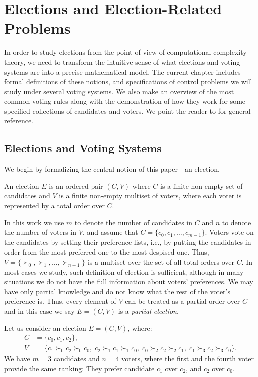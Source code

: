 \chapter{Elections and Election-Related Problems} \label{ch:elections}

In order to study elections from the point of view of computational complexity theory, we need to transform the intuitive sense of what elections and voting systems are into a precise mathematical model.
The current chapter includes formal definitions of these notions, and specifications of control problems we will study under several voting systems.
We also make an overview of the most common voting rules along with the demonstration of how they work for some specified collections of candidates and voters.
We point the reader to \cite{arrow} for general reference.

\section{Elections and Voting Systems} \label{sec:elections}

We begin by formalizing the central notion of this paper---an election.

\begin{definition}
    An election $E$ is an ordered pair $(C,V)$ where $C$ is a finite non-empty set of candidates and $V$ is a finite non-empty multiset of voters, where each voter is represented by a total order over $C$.
\end{definition}

In this work we use $m$ to denote the number of candidates in $C$ and $n$ to denote the number of voters in $V$, and assume that $C=\{c_0,c_1,\dots,c_{m-1}\}$.
Voters vote on the candidates by setting their preference lists, i.e., by putting the candidates in order from the most preferred one to the most despised one.
Thus, $V=\{\succ_0,\succ_1,\dots,\succ_{n-1}\}$ is a multiset over the set of all total orders over $C$.
In most cases we study, such definition of election is sufficient, although in many situations we do not have the full information about voters' preferences.
We may have only partial knowledge and do not know what the rest of the voter's preference is.
Thus, every element of $V$ can be treated as a partial order over $C$ and in this case we say $E=(C,V)$ is a \emph{partial election}.

\begin{Example} \label{ex:election1}
	Let us consider an election $E=(C,V)$, where:
	\begin{align*}
		C &= \{c_0,c_1,c_2\}, \\
		V &= \bigl\{c_1\succ_0c_2\succ_0c_0,\;c_2\succ_1c_1\succ_1c_0,\;c_0\succ_2c_2\succ_2c_1,\;c_1\succ_3c_2\succ_3c_0\bigr\}.
	\end{align*}
	We have $m=3$ candidates and $n=4$ voters, where the first and the fourth voter provide the same ranking:
	They prefer candidate $c_1$ over $c_2$, and $c_2$ over $c_0$.
\end{Example}

